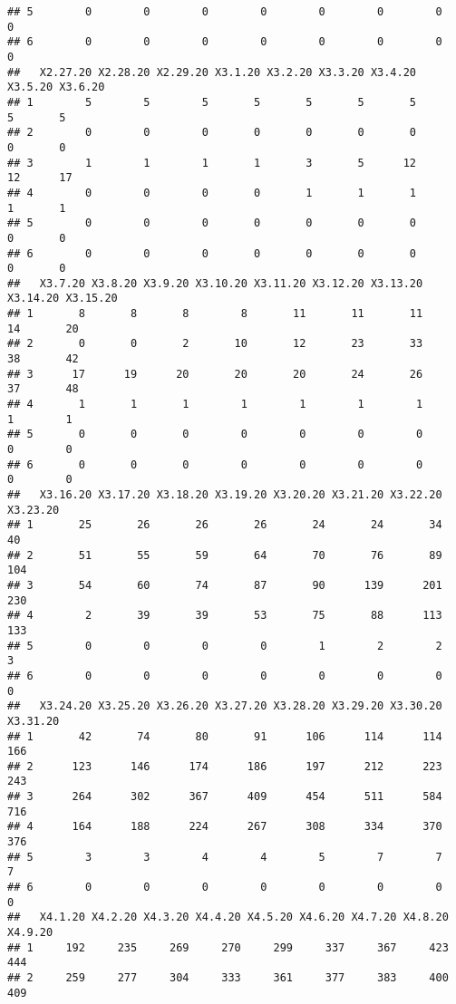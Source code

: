 \documentclass[
]{article}
\begin{document}
\begin{verbatim}
## 5        0        0        0        0        0        0        0        0
## 6        0        0        0        0        0        0        0        0
##   X2.27.20 X2.28.20 X2.29.20 X3.1.20 X3.2.20 X3.3.20 X3.4.20 X3.5.20 X3.6.20
## 1        5        5        5       5       5       5       5       5       5
## 2        0        0        0       0       0       0       0       0       0
## 3        1        1        1       1       3       5      12      12      17
## 4        0        0        0       0       1       1       1       1       1
## 5        0        0        0       0       0       0       0       0       0
## 6        0        0        0       0       0       0       0       0       0
##   X3.7.20 X3.8.20 X3.9.20 X3.10.20 X3.11.20 X3.12.20 X3.13.20 X3.14.20 X3.15.20
## 1       8       8       8        8       11       11       11       14       20
## 2       0       0       2       10       12       23       33       38       42
## 3      17      19      20       20       20       24       26       37       48
## 4       1       1       1        1        1        1        1        1        1
## 5       0       0       0        0        0        0        0        0        0
## 6       0       0       0        0        0        0        0        0        0
##   X3.16.20 X3.17.20 X3.18.20 X3.19.20 X3.20.20 X3.21.20 X3.22.20 X3.23.20
## 1       25       26       26       26       24       24       34       40
## 2       51       55       59       64       70       76       89      104
## 3       54       60       74       87       90      139      201      230
## 4        2       39       39       53       75       88      113      133
## 5        0        0        0        0        1        2        2        3
## 6        0        0        0        0        0        0        0        0
##   X3.24.20 X3.25.20 X3.26.20 X3.27.20 X3.28.20 X3.29.20 X3.30.20 X3.31.20
## 1       42       74       80       91      106      114      114      166
## 2      123      146      174      186      197      212      223      243
## 3      264      302      367      409      454      511      584      716
## 4      164      188      224      267      308      334      370      376
## 5        3        3        4        4        5        7        7        7
## 6        0        0        0        0        0        0        0        0
##   X4.1.20 X4.2.20 X4.3.20 X4.4.20 X4.5.20 X4.6.20 X4.7.20 X4.8.20 X4.9.20
## 1     192     235     269     270     299     337     367     423     444
## 2     259     277     304     333     361     377     383     400     409

\end{verbatim}
\end{document}
